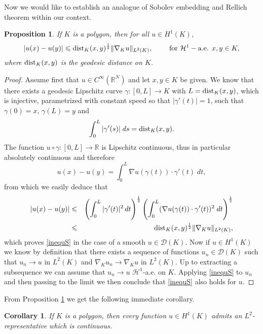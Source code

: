 \documentclass[12pt,english]{smfart} %
\newtheorem{proposition}[theorem]{Proposition}
\newtheorem{corollary}[theorem]{Corollary}
\theoremstyle{remark}
\newcommand{\R}{\mathbb{R}}
\newcommand{\dist}{\rm{dist}}
\begin{document}
Now we would like to establish an analogue of Sobolev embedding and Rellich theorem within our context.   


\medskip\begin{proposition}\label{embb} If $K$ is a polygon, then for all $u\in H^1(K)$,  
\begin{eqnarray}
|u(x)-u(y)|\leqslant {\dist}_K(x,y)^\frac{1}{2} \|\nabla_K u\|_{L^2(K)}, \quad \quad \text{ for } \mathcal{H}^1-\text{a.e. } x,y \in K, \label{inequS} 
\end{eqnarray}
where ${\dist}_K(x,y)$ is the geodesic distance on $K$.  
\end{proposition}

\begin{proof} Assume first that $u \in C^\infty(\R^N)$ and let $x,y \in K$ be given. We know that there exists a geodesic Lipschitz curve $\gamma : [0,L]\to K$ with $L={\dist}_K(x,y)$,  which is injective,   parametrized with constant speed so that 
$|\gamma'(t)|=1$, such that $\gamma(0)=x$, $\gamma(L)=y$ and 
$$\int_{0}^L |\gamma'(s)| \;ds= {\rm dist}_K(x,y).$$
The function $u\circ \gamma :[0,L]\to \R$ is Lipschitz continuous,  thus in particular absolutely continuous and therefore
$$u(x)-u(y)=\int_0^L \nabla u(\gamma (t))\cdot\gamma'(t) \;dt,$$
from which we easily deduce that 
\begin{eqnarray}
|u(x)-u(y)| &\leqslant& \left(\int_0^L |\gamma'(t)|^2\, dt\right)^{\frac{1}{2}} \left(\int_0^L (\nabla u(\gamma (t)) \cdot \gamma'(t) )^2 \;dt \right)^{\frac{1}{2}} \notag \\
&\leqslant &{\rm dist}_K(x,y)^\frac{1}{2} \|\nabla_K u\|_{L^2(K)} , \notag
\end{eqnarray}
which  proves \eqref{inequS} in the case of a smooth $u\in \mathcal{D}(K)$. Now if $u\in H^1(K)$ we know by definition that there exists a sequence of functions $u_n \in \mathcal{D}(K)$ such that $u_n\to u$ in $L^2(K)$ and $\nabla_K u_n \to \nabla_K u$   in $L^2(K)$. Up to extracting a subsequence we can assume that $u_n\to u$ $\mathcal{H}^1$-a.e.\! on $K$. Applying \eqref{inequS}   to $u_n$ and then passing to the limit we  then conclude that \eqref{inequS} also holds for $u$.
\end{proof}

From Proposition \ref{embb} we get the following immediate corollary.

\medskip\begin{corollary} If $K$ is a polygon,  then every function $u\in H^1(K)$ admits an $L^2$-representative which is continuous.
\end{corollary}
\end{document}
